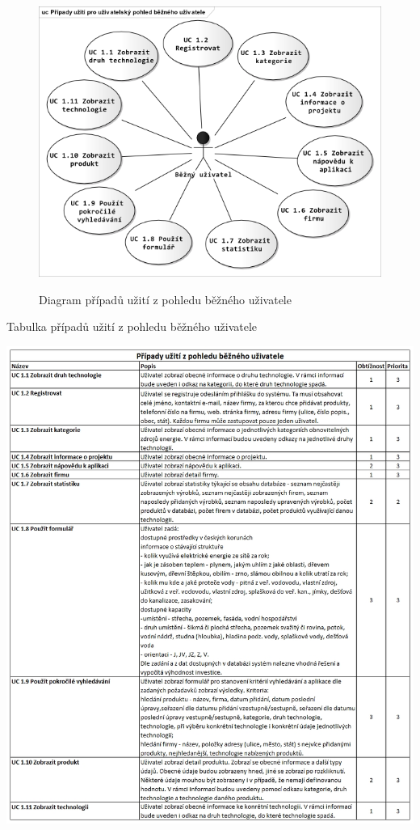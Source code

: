\documentclass[11pt,a4paper]{article}
\begin{document}
\begin{figure}[H] 
\centering 
\caption{Diagram případů užití z pohledu běžného uživatele}
\vspace{0.1cm} 
\includegraphics[scale=0.8]{vize_DTOZE_UC_dg1_n} 
\label{fig:UC_diagram_BU}
\end{figure} 

\begin{table}[H] 
\centering 
\caption{Tabulka případů užití z pohledu běžného uživatele} 
\includegraphics[scale=0.5]{vize_DTOZE_UC_1} 
\label{fig:UC_tabulka_BU}
\end{table} 
\end{document}
